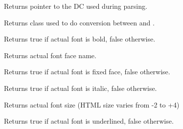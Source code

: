 \label{wxhtmlwinparsergetdc}


Returns pointer to the DC used during parsing.

\label{wxhtmlwinparsergetencodingconverter}


Returns  class used
to do conversion between  
and .

\label{wxhtmlwinparsergetfontbold}


Returns true if actual font is bold, false otherwise.

\label{wxhtmlwinparsergetfontface}


Returns actual font face name.

\label{wxhtmlwinparsergetfontfixed}


Returns true if actual font is fixed face, false otherwise.

\label{wxhtmlwinparsergetfontitalic}


Returns true if actual font is italic, false otherwise.

\label{wxhtmlwinparsergetfontsize}


Returns actual font size (HTML size varies from -2 to +4)

\label{wxhtmlwinparsergetfontunderlined}


Returns true if actual font is underlined, false otherwise.

\label{wxhtmlwinparsergetinputencoding}

